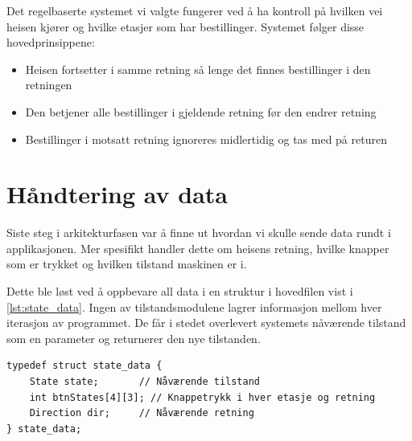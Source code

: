 Det regelbaserte systemet vi valgte fungerer ved å ha kontroll på hvilken vei heisen kjører og hvilke etasjer som har bestillinger. Systemet følger disse hovedprinsippene:
\begin{itemize}
    \item Heisen fortsetter i samme retning så lenge det finnes bestillinger i den retningen
    \item Den betjener alle bestillinger i gjeldende retning før den endrer retning
    \item Bestillinger i motsatt retning ignoreres midlertidig og tas med på returen
\end{itemize}


\section{Håndtering av data}
Siste steg i arkitekturfasen var å finne ut hvordan vi skulle sende data rundt i applikasjonen. Mer spesifikt handler dette om heisens retning, hvilke knapper som er trykket og hvilken tilstand maskinen er i. 

Dette ble løst ved å oppbevare all data i en struktur i hovedfilen vist i \ref{lst:state_data}.  Ingen av tilstandsmodulene lagrer informasjon mellom hver iterasjon av programmet. De får i stedet overlevert systemets nåværende tilstand som en parameter og returnerer den nye tilstanden.

\begin{lstlisting}[style=cpp, caption=Datastrukturen som sendes til hver tilstandsfunksjon,  label={lst:state_data}]
typedef struct state_data {
    State state;       // Nåværende tilstand
    int btnStates[4][3]; // Knappetrykk i hver etasje og retning
    Direction dir;     // Nåværende retning
} state_data;
\end{lstlisting}


